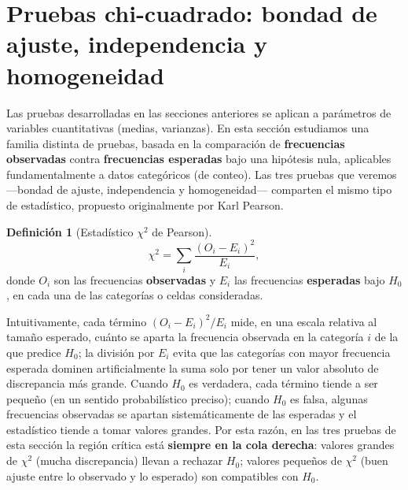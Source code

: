 \documentclass[11pt,a4paper]{article}
\theoremstyle{plain}
\theoremstyle{definition}
\newtheorem{definicion}[teorema]{Definición}
\theoremstyle{remark}
\begin{document}
\newpage
\section{Pruebas chi-cuadrado: bondad de ajuste, independencia y homogeneidad}

Las pruebas desarrolladas en las secciones anteriores se aplican a parámetros de variables cuantitativas (medias, varianzas). En esta sección estudiamos una familia distinta de pruebas, basada en la comparación de \textbf{frecuencias observadas} contra \textbf{frecuencias esperadas} bajo una hipótesis nula, aplicables fundamentalmente a datos categóricos (de conteo). Las tres pruebas que veremos —bondad de ajuste, independencia y homogeneidad— comparten el mismo tipo de estadístico, propuesto originalmente por Karl Pearson.

\begin{definicion}[Estadístico $\chi^2$ de Pearson]
\[
\chi^2=\sum_i\frac{(O_i-E_i)^2}{E_i},
\]
donde $O_i$ son las frecuencias \textbf{observadas} y $E_i$ las frecuencias \textbf{esperadas} bajo $H_0$, en cada una de las categorías o celdas consideradas.
\end{definicion}

Intuitivamente, cada término $(O_i-E_i)^2/E_i$ mide, en una escala relativa al tamaño esperado, cuánto se aparta la frecuencia observada en la categoría $i$ de la que predice $H_0$; la división por $E_i$ evita que las categorías con mayor frecuencia esperada dominen artificialmente la suma solo por tener un valor absoluto de discrepancia más grande. Cuando $H_0$ es verdadera, cada término tiende a ser pequeño (en un sentido probabilístico preciso); cuando $H_0$ es falsa, algunas frecuencias observadas se apartan sistemáticamente de las esperadas y el estadístico tiende a tomar valores grandes. Por esta razón, en las tres pruebas de esta sección la región crítica está \textbf{siempre en la cola derecha}: valores grandes de $\chi^2$ (mucha discrepancia) llevan a rechazar $H_0$; valores pequeños de $\chi^2$ (buen ajuste entre lo observado y lo esperado) son compatibles con $H_0$.

\begin{center}
\end{center}
\end{document}
